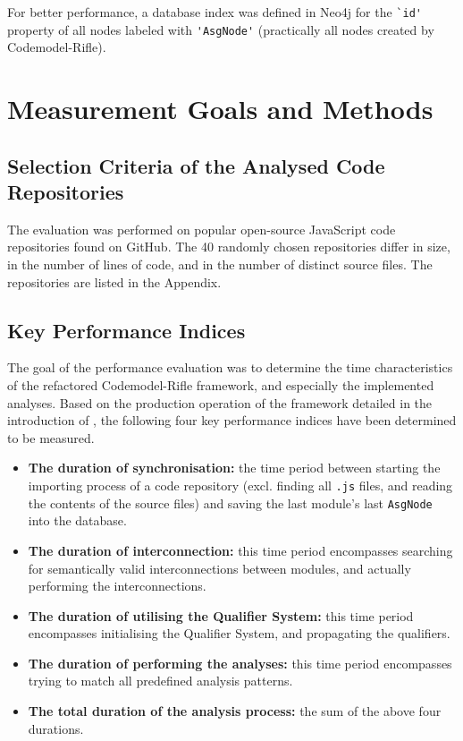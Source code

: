 For better performance, a database index was defined in Neo4j for the \lstinline{`id'} property of all nodes labeled with \lstinline{'AsgNode'} (practically all nodes created by Codemodel-Rifle).


\section{Measurement Goals and Methods}

\subsection{Selection Criteria of the Analysed Code Repositories}

The evaluation was performed on popular open-source JavaScript code repositories found on GitHub. The 40 randomly chosen repositories differ in size, in the number of lines of code, and in the number of distinct source files. The repositories are listed in the Appendix.


\subsection{Key Performance Indices}

The goal of the performance evaluation was to determine the time characteristics of the refactored Codemodel-Rifle framework, and especially the implemented analyses. Based on the production operation of the framework detailed in the introduction of , the following four key performance indices have been determined to be measured.

\begin{itemize}
\item \textbf{The duration of synchronisation:} the time period between starting the importing process of a code repository (excl. finding all \lstinline{.js} files, and reading the contents of the source files) and saving the last module's last \lstinline{AsgNode} into the database.
\item \textbf{The duration of interconnection:} this time period encompasses searching for semantically valid interconnections between modules, and actually performing the interconnections.
\item \textbf{The duration of utilising the Qualifier System:} this time period encompasses initialising the Qualifier System, and propagating the qualifiers.
\item \textbf{The duration of performing the analyses:} this time period encompasses trying to match all predefined analysis patterns.
\item \textbf{The total duration of the analysis process:} the sum of the above four durations.
\end{itemize}

